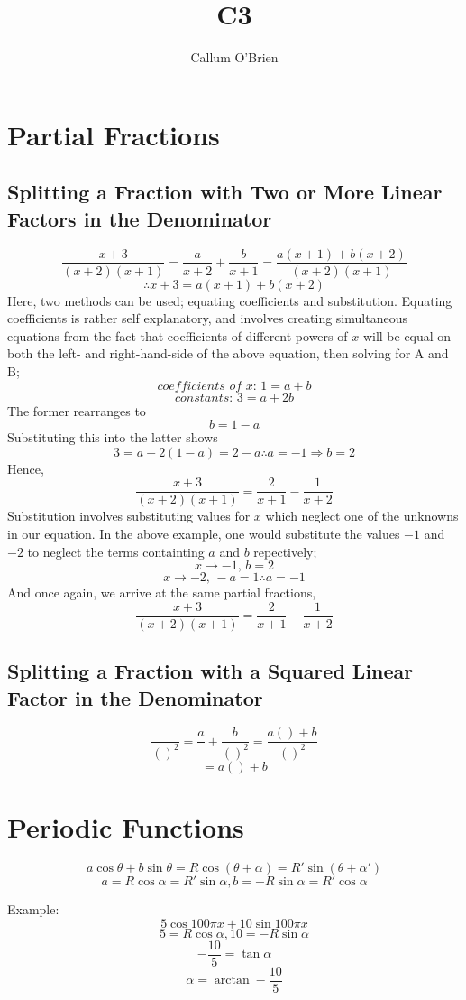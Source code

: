 \documentclass{article}
\title{C3}
\author{Callum O'Brien}
\begin{document}
\maketitle
\tableofcontents
\newpage

\section{Partial Fractions}
\subsection{Splitting a Fraction with Two or More Linear Factors in the Denominator}
\[\frac{x+3}{(x+2)(x+1)}=\frac{a}{x+2}+\frac{b}{x+1}=\frac{a(x+1)+b(x+2)}{(x+2)(x+1)}\]
\[\therefore x+3=a(x+1)+b(x+2)\]
Here, two methods can be used; equating coefficients and substitution. Equating coefficients is rather self explanatory, and involves creating simultaneous equations from the fact that coefficients of different powers of $x$ will be equal on both the left- and right-hand-side of the above equation, then solving for A and B;
\[\textit{coefficients of }x\textit{: }1=a+b\]
\[\textit{constants: }3=a+2b\]
\noindent The former rearranges to
\[b=1-a\]
\noindent Substituting this into the latter shows
\[3=a+2(1-a)=2-a\therefore a=-1\Rightarrow b=2\]
\noindent Hence,
\[\frac{x+3}{(x+2)(x+1)}=\frac{2}{x+1}-\frac{1}{x+2}\]
\noindent Substitution involves substituting values for $x$ which neglect one of the unknowns in our equation. In the above example, one would substitute the values $-1$ and $-2$ to neglect the terms containting $a$ and $b$ repectively;
\[x\rightarrow-1\textit{, }b=2\]
\[x\rightarrow-2\textit{, }-a=1\therefore a=-1\]
And once again, we arrive at the same partial fractions,
\[\frac{x+3}{(x+2)(x+1)}=\frac{2}{x+1}-\frac{1}{x+2}\]

\subsection{Splitting a Fraction with a Squared Linear Factor in the Denominator}
\[\frac{}{()^2}=\frac{a}{}+\frac{b}{()^2}=\frac{a()+b}{()^2}\]
\[=a()+b\]

\section{Periodic Functions}

\[a\cos\theta+b\sin\theta=R\cos(\theta+\alpha)=R'\sin(\theta+\alpha')\]
\[a=R\cos\alpha=R'\sin\alpha,b=-R\sin\alpha=R'\cos\alpha\]

\noindent Example:
\[5\cos100\pi x+10\sin100\pi x\]
\[5=R\cos\alpha,10=-R\sin\alpha\]
\[-\frac{10}{5}=\tan\alpha\]
\[\alpha=\arctan-\frac{10}{5}\]
\end{document}
